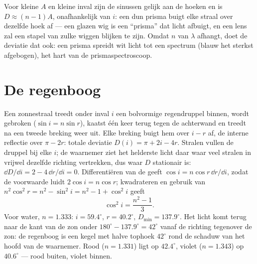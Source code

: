 \begin{remark}\label{rem:b1:rays-reflection-refraction:thin}
Voor kleine $A$ en kleine inval zijn de sinussen gelijk aan de hoeken en is
$D \approx (n - 1)A$, onafhankelijk van $i$: een dun prisma buigt elke straal
over dezelfde hoek af --- een glazen wig is een ``prisma'' dat licht afbuigt,
en een lens zal een stapel van zulke wiggen blijken te zijn. Omdat
$n$ van $\lambda$ afhangt, doet de deviatie dat ook: een prisma spreidt wit
licht tot een spectrum (blauw het sterkst afgebogen), het hart van de
prismaspectroscoop.
\end{remark}

\section{De regenboog}

\begin{example}\label{ex:b1:rays-reflection-refraction:rainbow}
Een zonnestraal treedt onder inval $i$ een bolvormige regendruppel binnen,
wordt gebroken ($\sin i = n\sin r$), kaatst één keer terug tegen de
achterwand en treedt na een tweede breking weer uit. Elke breking buigt hem
over $i - r$ af, de interne reflectie over $\pi - 2r$: totale deviatie
$D(i) = \pi + 2i - 4r$. Stralen vullen de druppel bij elke $i$; de waarnemer
ziet het helderste licht daar waar veel stralen in vrijwel dezelfde richting
vertrekken, dus waar $D$ stationair is: $\dd D/\dd i = 2 - 4\,\dd r/\dd i
= 0$. Differentiëren van de  geeft $\cos i = n\cos r\,\dd r/\dd i$,
zodat de voorwaarde luidt $2\cos i = n\cos r$; kwadrateren en gebruik van
$n^2\cos^2 r = n^2 - \sin^2 i = n^2 - 1 + \cos^2 i$ geeft
\[
\cos^2 i = \frac{n^2 - 1}{3} .
\]
Voor water, $n = 1.333$: $i = 59.4^\circ$, $r = 40.2^\circ$,
$D_{\min} = 137.9^\circ$. Het licht komt terug naar de kant van de zon
onder $180^\circ - 137.9^\circ = 42^\circ$ vanaf de richting tegenover de zon:
de regenboog is een kegel met halve tophoek $42^\circ$ rond de schaduw van het
hoofd van de waarnemer. Rood ($n = 1.331$) ligt op $42.4^\circ$, violet
($n = 1.343$) op $40.6^\circ$ --- rood buiten, violet binnen.
\end{example}

